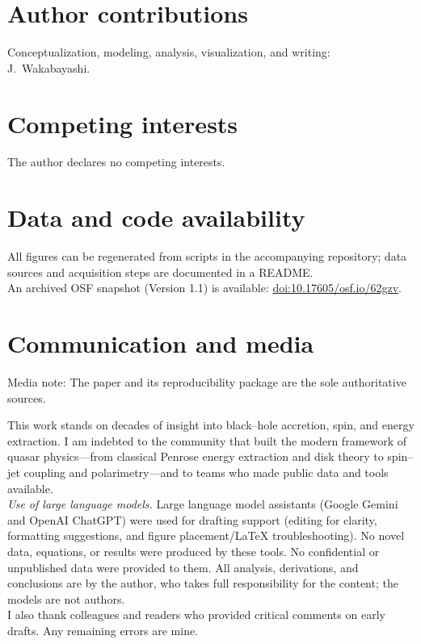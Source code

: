 \documentclass[twocolumn]{aastex701}
\begin{document}
\section*{Author contributions}
Conceptualization, modeling, analysis, visualization, and writing: J.~Wakabayashi.

\section*{Competing interests}
The author declares no competing interests.

\section*{Data and code availability}
All figures can be regenerated from scripts in the accompanying repository; data sources and acquisition steps are documented in a README.\\
An archived OSF snapshot (Version 1.1) is available: \href{https://doi.org/10.17605/osf.io/62gzv}{doi:10.17605/osf.io/62gzv}.
\section*{Communication and media}
Media note: The paper and its reproducibility package are the sole authoritative sources.

\begin{acknowledgments}
This work stands on decades of insight into black–hole accretion, spin, and energy extraction. I am indebted to the community that built the modern framework of quasar physics—from classical Penrose energy extraction and disk theory to spin–jet coupling and polarimetry—and to teams who made public data and tools available.
\\[2pt]
\textit{Use of large language models.} Large language model assistants (Google Gemini and OpenAI ChatGPT) were used for drafting support (editing for clarity, formatting suggestions, and figure placement/LaTeX troubleshooting). No novel data, equations, or results were produced by these tools. No confidential or unpublished data were provided to them. All analysis, derivations, and conclusions are by the author, who takes full responsibility for the content; the models are not authors.
\\[2pt]
I also thank colleagues and readers who provided critical comments on early drafts. Any remaining errors are mine.
\end{acknowledgments}


\nocite{*}


\end{document}
